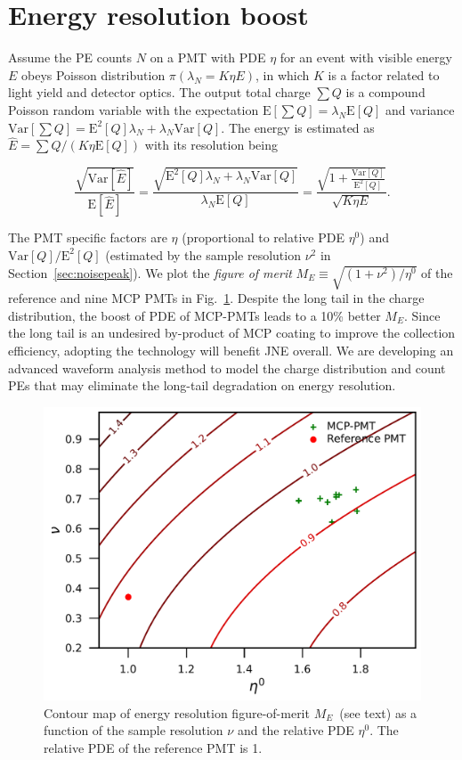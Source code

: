 \section{Energy resolution boost}
\label{Result}
Assume the PE counts $N$ on a PMT with PDE $\eta$ for an event with visible energy $E$ obeys Poisson distribution $\pi(\lambda_N=K\eta E)$, in which $K$ is a factor related to light yield and detector optics. The output total charge $\sum{Q}$ is a compound Poisson random variable with the expectation $\mathrm{E}[\sum{Q}]=\lambda_N\mathrm{E}[Q]$ and variance $\mathrm{Var}[\sum{Q}]=\mathrm{E}^2[Q]\lambda_N+\lambda_N\mathrm{Var}[Q]$. The energy is estimated as $\hat{E}=\sum{Q}/(K\eta\mathrm{E}[Q])$ with its resolution being

\begin{equation}
    \frac{\sqrt{\mathrm{Var}[\hat{E}]}}{\mathrm{E}[\hat{E}]}=\frac{\sqrt{\mathrm{E}^2[Q]\lambda_N+\lambda_N\mathrm{Var}[Q]}}{\lambda_N\mathrm{E}[Q]}=\frac{\sqrt{1+\frac{\mathrm{Var}[Q]}{\mathrm{E}^2[Q]}}}{\sqrt{K\eta E}}.
\end{equation}

The PMT specific factors are $\eta$ (proportional to relative PDE $\eta^0$) and $\mathrm{Var}[Q]/ \mathrm{E}^2[Q]$ (estimated by the sample resolution $\nu^2$ in Section~\ref{sec:noisepeak}).  We plot the \emph{figure of merit} $M_{E}\equiv\sqrt{({1+\nu^2})/{\eta^0}}$ of the reference and nine MCP PMTs in Fig.~\ref{fig:EnergyResolution}. Despite the long tail in the charge distribution, the boost of PDE of MCP-PMTs leads to a 10\% better $M_{E}$.  Since the long tail is an undesired by-product of MCP coating to improve the collection efficiency, adopting the technology will benefit JNE overall.  We are developing an advanced waveform analysis method to model the charge distribution and count PEs that may eliminate the long-tail degradation on energy resolution.

\begin{figure}[!htbp]
    \centering
    \includegraphics[width=\MF\textwidth]{figures/result/resolution.pdf}
    \caption{Contour map of energy resolution figure-of-merit $M_{E}$~(see text) as a function of the sample resolution $\nu$ and the relative PDE $\eta^0$. The relative PDE of the reference PMT is 1.}
    \label{fig:EnergyResolution}
\end{figure}

